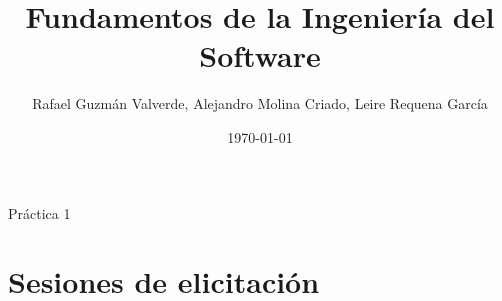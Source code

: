 \documentclass[10pt]{report}
\author{Rafael Guzmán Valverde, Alejandro Molina Criado, Leire Requena García}
\title{Fundamentos de la Ingeniería del Software}
\date{\today}
\begin{document}
            {Práctica 1}
            {}
\tableofcontents



\chapter{Sesiones de elicitación}











%


\end{document}
